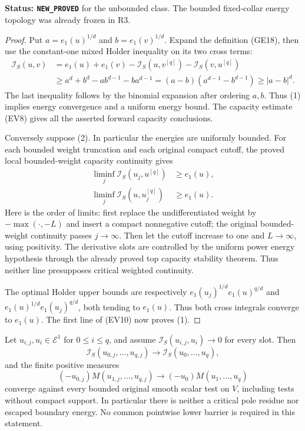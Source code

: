 \noindent\textbf{Status: \texttt{NEW\_PROVED}} for the
unbounded class. The bounded fixed-collar energy topology
was already frozen in R3.

\begin{proof}
Put $a=e_1(u)^{1/d}$ and $b=e_1(v)^{1/d}$.
Expand the definition (GE18), then use the constant-one
mixed Holder inequality on its two cross terms:
\[
 \begin{split}
 \mathscr I_S(u,v)
 &=e_1(u)+e_1(v)
       -\mathcal I_S(u,v^{[q]})-\mathcal I_S(v,u^{[q]})\\
 &\geq a^d+b^d-ab^{d-1}-ba^{d-1}
       =(a-b)(a^{d-1}-b^{d-1})\geq|a-b|^d.
 \end{split}
 \tag{EV10}
\]
The last inequality follows by the binomial expansion after
ordering $a,b$. Thus (1) implies energy convergence and a
uniform energy bound. The capacity estimate (EV8) gives
all the asserted forward capacity conclusions.

Conversely suppose (2). In particular the energies are
uniformly bounded. For each bounded weight truncation and
each original compact cutoff, the proved local bounded-weight
capacity continuity gives
\[
 \begin{split}
 \liminf_j\mathcal I_S(u_j,u^{[q]})&\geq e_1(u),\\
 \liminf_j\mathcal I_S(u,u_j^{[q]})&\geq e_1(u).
 \end{split}
 \tag{EV11}
\]
Here is the order of limits: first replace the
undifferentiated weight by $-\max(\cdot,-L)$ and insert a
compact nonnegative cutoff; the original bounded-weight
continuity passes $j\to\infty$. Then let the cutoff
increase to one and $L\to\infty$, using positivity.
The derivative slots are controlled by the uniform power
energy hypothesis through the already proved top capacity
stability theorem. Thus neither line presupposes critical
weighted continuity.

The optimal Holder upper bounds are respectively
$e_1(u_j)^{1/d}e_1(u)^{q/d}$ and
$e_1(u)^{1/d}e_1(u_j)^{q/d}$, both tending to $e_1(u)$.
Thus both cross integrals converge to $e_1(u)$.
The first line of (EV10) now proves (1).
\end{proof}

\begin{theorem}
\label{thm:r11-strong-critical-mixed-continuity}
Let $u_{i,j},u_i\in\mathcal E^1$ for $0\leq i\leq q$,
and assume $\mathscr I_S(u_{i,j},u_i)\to0$ for every slot.
Then
\[
 \mathcal I_S(u_{0,j},\ldots,u_{q,j})
                  \longrightarrow\mathcal I_S(u_0,\ldots,u_q),
 \tag{EV12}
\]
and the finite positive measures
\[
 (-u_{0,j})M(u_{1,j},\ldots,u_{q,j})
                      \longrightarrow(-u_0)M(u_1,\ldots,u_q)
 \tag{EV13}
\]
converge against every bounded original smooth scalar test
on $V$, including tests without compact support. In
particular there is neither a critical pole residue nor
escaped boundary energy. No common pointwise lower barrier
is required in this statement.
\end{theorem}

